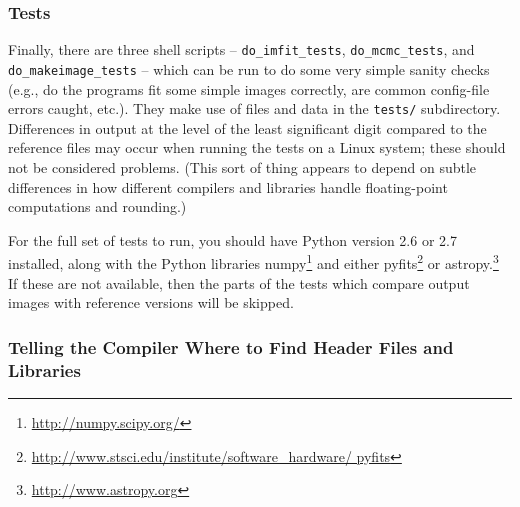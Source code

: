 \documentclass[10pt,a4paper,article]{memoir}
\newcommand{\Imfit}{\textbf{Imfit}}
\newcommand{\makeimage}{\texttt{makeimage}}
\begin{document}
\subsubsection{Tests}

Finally, there are three shell scripts -- \texttt{do\_imfit\_tests},
\texttt{do\_mcmc\_tests}, and \texttt{do\_makeimage\_tests} -- which can
be run to do some very simple sanity checks (e.g., do the programs fit
some simple images correctly, are common config-file errors caught,
etc.). They make use of files and data in the \texttt{tests/}
subdirectory. Differences in output at the level of the least
significant digit compared to the reference files may occur when running
the tests on a Linux system; these should not be considered problems.
(This sort of thing appears to depend on subtle differences in how
different compilers and libraries handle floating-point computations and
rounding.)

For the full set of tests to run,
you should have Python version 2.6 or 2.7 installed, along with the
Python libraries numpy\footnote{\url{http://numpy.scipy.org/}} and
either
pyfits\footnote{\url{http://www.stsci.edu/institute/software_hardware/
pyfits}} or astropy.\footnote{\url{http://www.astropy.org}} If these are
not available, then the parts of the tests which compare output images
with reference versions will be skipped.


%
%


\subsubsection{Telling the Compiler Where to Find Header Files and Libraries}
\end{document}
